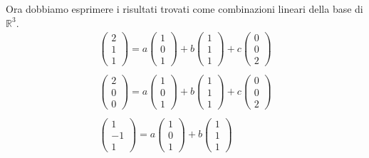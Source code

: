 \begin{example}
	Ora dobbiamo esprimere i risultati trovati come combinazioni lineari della base di
	$\mathbb{R}^3$.
	\begin{gather*}
		\begin{pmatrix}
			2 \\ 1 \\ 1
		\end{pmatrix} =
		a \begin{pmatrix}
			1 \\ 0 \\ 1
		\end{pmatrix} +
		b \begin{pmatrix}
			1 \\ 1 \\ 1
		\end{pmatrix} +
		c \begin{pmatrix}
			0 \\ 0 \\ 2
		\end{pmatrix}\\
		\\
		\begin{pmatrix}
			2 \\ 0 \\ 0
		\end{pmatrix} =
		a \begin{pmatrix}
			1 \\ 0 \\ 1
		\end{pmatrix} +
		b \begin{pmatrix}
			1 \\ 1 \\ 1
		\end{pmatrix} +
		c \begin{pmatrix}
			0 \\ 0 \\ 2
		\end{pmatrix}\\
		\\
		\begin{pmatrix}
			1 \\ -1 \\ 1
		\end{pmatrix} =
		a \begin{pmatrix}
			1 \\ 0 \\ 1
		\end{pmatrix} +
		b \begin{pmatrix}
			1 \\ 1 \\ 1

\end{pmatrix}
\end{gather*}
\end{example}
